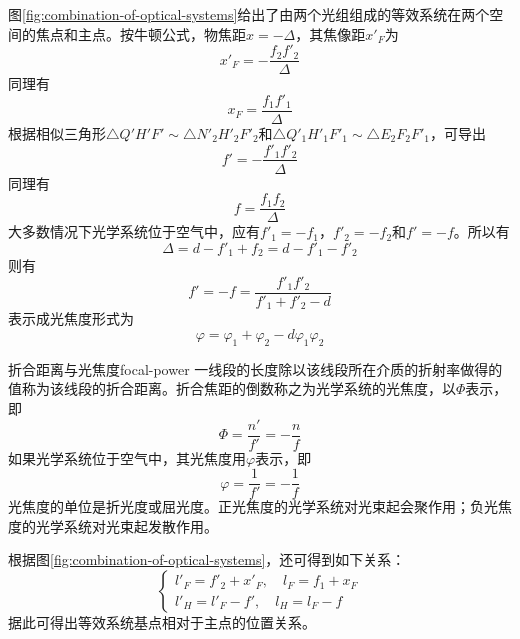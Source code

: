 \documentclass[cn,11pt]{elegantbook}
\begin{document}
图\ref{fig:combination-of-optical-systems}给出了由两个光组组成的等效系统在两个空间的焦点和主点。按牛顿公式，物焦距$x=-\Delta$，其焦像距$x'_F$为
\begin{equation}
x'_F=-\frac{f_2f'_2}{\Delta}
\end{equation}
同理有
\begin{equation}
x_F=\frac{f_1f'_1}{\Delta}
\end{equation}
根据相似三角形$\triangle Q'H'F'\sim\triangle N'_2H'_2F'_2$和$\triangle Q'_1H'_1F'_1\sim\triangle E_2F_2F'_1$，可导出
\begin{equation}
f'=-\frac{f'_1f'_2}{\Delta}
\end{equation}
同理有
\begin{equation}
f=\frac{f_1f_2}{\Delta}
\end{equation}
大多数情况下光学系统位于空气中，应有$f'_1=-f_1$，$f'_2=-f_2$和$f'=-f$。所以有
\begin{equation}
\Delta=d-f'_1+f_2=d-f'_1-f'_2
\end{equation}
则有
\begin{equation}
f'=-f=\frac{f'_1f'_2}{f'_1+f'_2-d}
\end{equation}
表示成光焦度形式为
\begin{equation}
\varphi=\varphi_1+\varphi_2-d\varphi_1\varphi_2
\end{equation}

\begin{definition}{折合距离与光焦度}{focal-power}
	一线段的长度除以该线段所在介质的折射率做得的值称为该线段的折合距离。折合焦距的倒数称之为光学系统的光焦度，以$\Phi$表示，即
	\begin{equation}
	\Phi=\frac{n'}{f'}=-\frac{n}{f}
	\end{equation}
	如果光学系统位于空气中，其光焦度用$\varphi$表示，即
	\begin{equation}
	\varphi=\frac{1}{f'}=-\frac{1}{f}
	\end{equation}
	光焦度的单位是折光度或屈光度。正光焦度的光学系统对光束起会聚作用；负光焦度的光学系统对光束起发散作用。
\end{definition}

根据图\ref{fig:combination-of-optical-systems}，还可得到如下关系：
\begin{equation}
\begin{cases}
l'_F=f'_2+x'_F,\quad l_F=f_1+x_F\\
l'_H=l'_F-f',\quad l_H=l_F-f
\end{cases}
\end{equation}
据此可得出等效系统基点相对于主点的位置关系。
\end{document}
